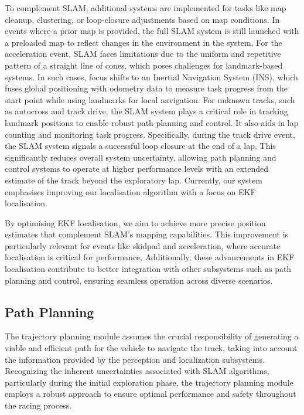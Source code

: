 \documentclass[a4paper,11pt]{report}
\begin{document}
To complement SLAM, additional systems are implemented for tasks like map cleanup, clustering, or loop-closure adjustments based on map conditions. In events where a prior map is provided, the full SLAM system is still launched with a preloaded map to reflect changes in the environment in the system. For the acceleration event, SLAM faces limitations due to the uniform and repetitive pattern of a straight line of cones, which poses challenges for landmark-based systems. In such cases, focus shifts to an Inertial Navigation System (INS), which fuses global positioning with odometry data to measure task progress from the start point while using landmarks for local navigation. For unknown tracks, such as autocross and track drive, the SLAM system plays a critical role in tracking landmark positions to enable robust path planning and control. It also aids in lap counting and monitoring task progress. Specifically, during the track drive event, the SLAM system signals a successful loop closure at the end of a lap. This significantly reduces overall system uncertainty, allowing path planning and control systems to operate at higher performance levels with an extended estimate of the track beyond the exploratory lap. Currently, our system emphasises improving our localisation algorithm with a focus on EKF localisation.

By optimising EKF localisation, we aim to achieve more precise position estimates that complement SLAM's mapping capabilities. This improvement is particularly relevant for events like skidpad and acceleration, where accurate localisation is critical for performance. Additionally, these advancements in EKF localisation contribute to better integration with other subsystems such as path planning and control, ensuring seamless operation across diverse scenarios.

\subsection{Path Planning}

The trajectory planning module assumes the crucial responsibility of generating a viable and efficient path for the vehicle to navigate the track, taking into account the information provided by the perception and localization subsystems. Recognizing the inherent uncertainties associated with SLAM algorithms, particularly during the initial exploration phase, the trajectory planning module employs a robust approach to ensure optimal performance and safety throughout the racing process.
\end{document}
